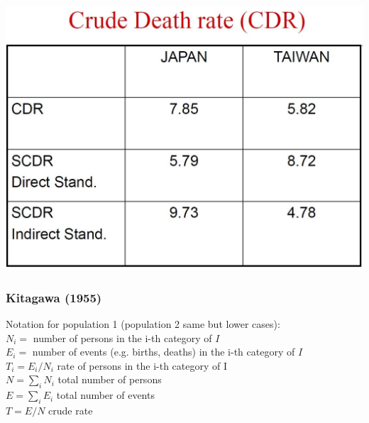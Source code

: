 \documentclass[xcolor={dvipsnames}]{beamer}
\begin{document}
\begin{frame}
\begin{center}
\includegraphics[scale=.3]{Figures/VCR5}
\end{center}
\end{frame}


\begin{frame}



\end{frame}

\begin{frame}\frametitle{Kitagawa (1955)}
\large{
Notation for population 1 (population 2 same but lower cases):\\
		\hphantom{}
$N_i =$ number of persons in the i-th category of $I$\\
		\hphantom{}
$E_i =$ number of events (e.g. births, deaths) in the i-th category of $I$\\
		\hphantom{}
$T_i = E_i/N_i$ rate of persons in the i-th category of I\\
		\hphantom{}
$N = \sum_iN_i$ total number of persons\\
		\hphantom{}
$E = \sum_iE_i$ total number of events\\
		\hphantom{}
$T = E/N$ crude rate

}
\end{frame}
\end{document}
